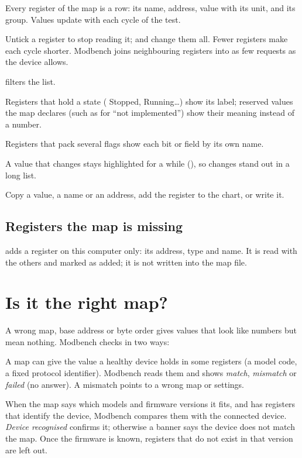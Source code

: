 Every register of the map is a row: its name, address, value with its unit,
and its group. Values update with each cycle of the test.

\begin{description}[style=nextline, leftmargin=0pt, font=\intermedium]
  \item[Choosing what to read] Untick a register to stop reading it;
     and  change them all. Fewer registers make
    each cycle shorter. Modbench joins neighbouring registers into as few
    requests as the device allows.
  \item[Search]  filters the list.
  \item[State labels] Registers that hold a state ( Stopped, 
    Running…) show its label; reserved values the map declares (such as
     for ``not implemented'') show their meaning instead of a
    number.
  \item[Bits and bit fields] Registers that pack several flags show each bit
    or field by its own name.
  \item[Changed values] A value that changes stays highlighted for a while
    (), so changes stand out in a long list.
  \item[Right-click] Copy a value, a name or an address, add the register to
    the chart, or write it.
\end{description}

\subsection{Registers the map is missing}

 adds a register on this computer
only: its address, type and name. It is read with the others and marked as
added; it is not written into the map file.

\section{Is it the right map?}

A wrong map, base address or byte order gives values that look like numbers
but mean nothing. Modbench checks in two ways:

\begin{description}[style=nextline, leftmargin=0pt, font=\intermedium]
  \item[Reference values] A map can give the value a healthy device holds in
    some registers (a model code, a fixed protocol identifier). Modbench reads
    them and shows \emph{match}, \emph{mismatch} or \emph{failed} (no answer).
    A mismatch points to a wrong map or settings.
  \item[Models and firmware] When the map says which models and firmware
    versions it fits, and has registers that identify the device, Modbench
    compares them with the connected device. \emph{Device recognised} confirms
    it; otherwise a banner says the device does not match the map. Once the
    firmware is known, registers that do not exist in that version are left
    out.
\end{description}

